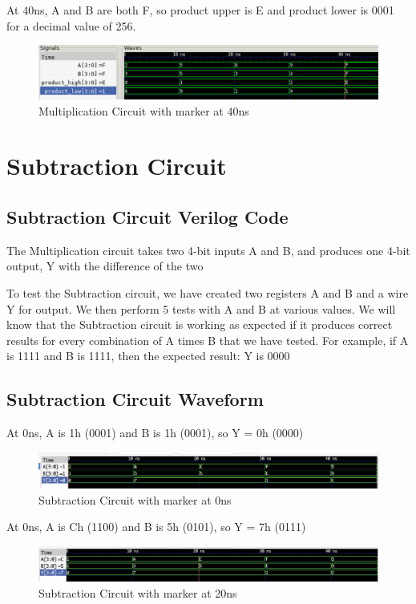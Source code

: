 \documentclass[12pt]{article}
\begin{document}
 At 40ns, A and B are both F, so product upper is E and product lower is 0001 for a decimal value of 256.
 \begin{figure}[H]
 \centering 
\includegraphics[width = 1.0\textwidth]{Multiplication/multiplication_wave2.png}
 \caption{Multiplication Circuit with marker at 40ns}
 \label{fig:enter-label}
 \end{figure}

\section{Subtraction Circuit}
\subsection{Subtraction Circuit Verilog Code} 
The Multiplication circuit takes two 4-bit inputs A and B, and produces one 4-bit output, Y with the difference of the two
 

To test the Subtraction circuit, we have created two registers A and B and a wire Y for output. We then perform 5 tests with A and B at various values. We will know that the Subtraction circuit is working as expected if it produces correct results for every combination of A times B that we have tested. For example, if A is 1111 and B is 1111, then the expected result: Y is 0000

\subsection{Subtraction Circuit Waveform} 

At 0ns, A is 1h (0001) and B is 1h (0001), so Y = 0h (0000)  
\begin{figure}[H]
 \centering
 \includegraphics[width = 1.0\textwidth]{Subtraction/Subtraction-0ns.png}
 \caption{Subtraction Circuit with marker at 0ns}
 \label{fig:enter-label} 
\end{figure} 

At 0ns, A is Ch (1100) and B is 5h (0101), so Y = 7h (0111)  
 \begin{figure}[H]
 \centering 
\includegraphics[width = 1.0\textwidth]{Subtraction/Subtraction-20ns.png}
 \caption{Subtraction Circuit with marker at 20ns}
 \label{fig:enter-label}
 \end{figure}
\end{document}
